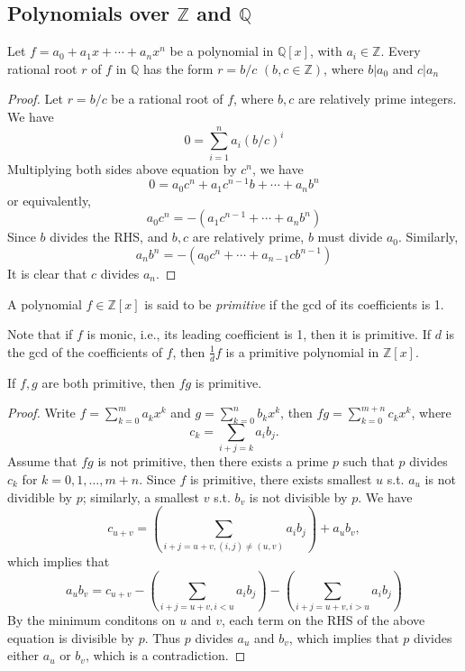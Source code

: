\subsection{Polynomials over $\mathbb{Z}$ and $\mathbb{Q}$}
\begin{theorem}
Let $f=a_0+a_1x+\cdots+a_nx^n$ be a polynomial in $\mathbb{Q}[x]$, with $a_i\in\mathbb{Z}$. Every rational root $r$ of $f$ in $\mathbb{Q}$ has the form $r=b/c$ $(b,c\in\mathbb{Z})$, where $b|a_0$ and $c|a_n$
\end{theorem}
\begin{proof}
Let $r=b/c$ be a rational root of $f$, where $b,c$ are relatively prime integers. We have
\[
0=\sum_{i=1}^na_i(b/c)^i
\]
Multiplying both sides above equation by $c^n$, we have
\[
0=a_0c^n+a_1c^{n-1}b+\cdots+a_nb^n
\]
or equivalently,
\[
a_0c^n=-(a_1c^{n-1}+\cdots+a_nb^n)
\]
Since $b$ divides the RHS, and $b,c$ are relatively prime, $b$ must divide $a_0$. Similarly,
\[
a_nb^n=-(a_0c^n+\cdots+a_{n-1}cb^{n-1})
\]
It is clear that $c$ divides $a_n$.
\end{proof}
\begin{definition}
A polynomial $f\in\mathbb{Z}[x]$ is said to be \emph{primitive} if the gcd of its coefficients is 1.
\end{definition}
\begin{remark}
Note that if $f$ is monic, i.e., its leading coefficient is 1, then it is primitive. If $d$ is the gcd of the coefficients of $f$, then $\frac{1}{d}f$ is a primitive polynomial in $\mathbb{Z}[x]$.
\end{remark}
\begin{theorem}
If $f,g$ are both primitive, then $fg$ is primitive.
\end{theorem}
\begin{proof}
Write $f=\sum_{k=0}^ma_kx^k$ and $g=\sum_{k=0}^nb_kx^k$, then $fg=\sum_{k=0}^{m+n}c_kx^k$, where
\[
c_{k}=\sum_{i+j=k}a_ib_j.
\]
Assume that $fg$ is not primitive, then there exists a prime $p$ such that $p$ divides $c_k$ for $k=0,1,\dots,m+n$. Since $f$ is primitive, there exists smallest $u$ s.t. $a_u$ is not dividible by $p$; similarly, a smallest $v$ s.t. $b_v$ is not divisible by $p$. We have
\[
c_{u+v}=\left(\sum_{i+j=u+v,(i,j)\ne(u,v)}a_ib_j\right)+a_ub_v,
\]
which implies that
\[
a_ub_v=c_{u+v}-
\left(\sum_{i+j=u+v,i<u}a_ib_j\right)
-
\left(\sum_{i+j=u+v,i>u}a_ib_j\right)
\]
By the minimum conditons on $u$ and $v$, each term on the RHS of the above equation is divisible by $p$. Thus $p$ divides $a_u$ and $b_v$, which implies that $p$ divides either $a_u$ or $b_v$, which is a contradiction.
\end{proof}
